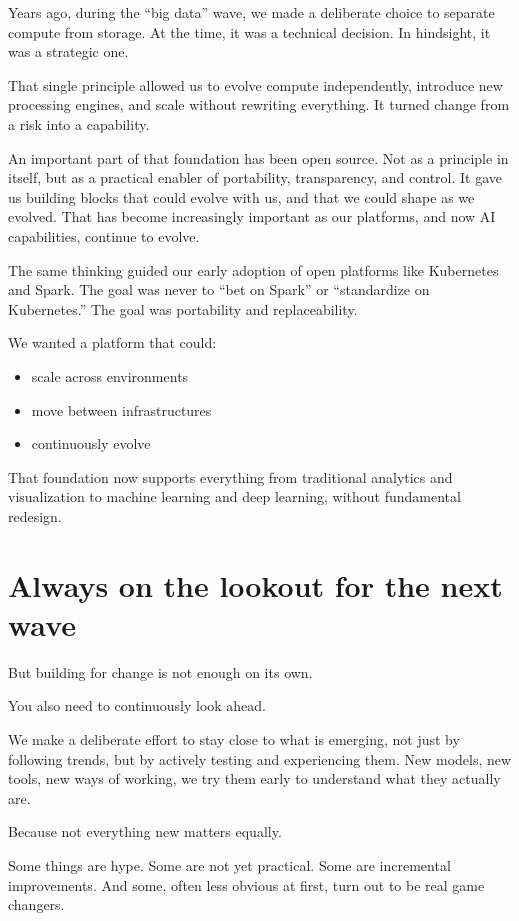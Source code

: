 \documentclass[11pt]{article}
\begin{document}
Years ago, during the ``big data'' wave, we made a deliberate choice to separate compute from storage. At the time, it was a technical decision. In hindsight, it was a strategic one.

That single principle allowed us to evolve compute independently, introduce new processing engines, and scale without rewriting everything. It turned change from a risk into a capability.

An important part of that foundation has been open source. Not as a principle in itself, but as a practical enabler of portability, transparency, and control. It gave us building blocks that could evolve with us, and that we could shape as we evolved. That has become increasingly important as our platforms, and now AI capabilities, continue to evolve.

The same thinking guided our early adoption of open platforms like Kubernetes and Spark. The goal was never to “bet on Spark” or “standardize on Kubernetes.” The goal was portability and replaceability.

\newpage

We wanted a platform that could:

\begin{itemize}
\item scale across environments
\item move between infrastructures
\item continuously evolve
\end{itemize}

That foundation now supports everything from traditional analytics and visualization to machine learning and deep learning, without fundamental redesign.

\section*{Always on the lookout for the next wave}

But building for change is not enough on its own.

You also need to continuously look ahead.

We make a deliberate effort to stay close to what is emerging, not just by following trends, but by actively testing and experiencing them. New models, new tools, new ways of working, we try them early to understand what they actually are.

Because not everything new matters equally.

Some things are hype. Some are not yet practical. Some are incremental improvements. And some, often less obvious at first, turn out to be real game changers.
\end{document}
